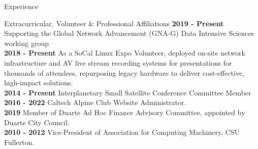 \documentclass{resume} %
\begin{document}
\begin{rSection}{Experience}



\begin{rSection}{ Extracurricular, Volunteer \& Professional Affiliations}
{\bf 2019 - Present} Supporting the Global Network Advancement (GNA-G) Data Intensive Sciences working group \\
{\bf 2018 - Present} As a SoCal Linux Expo Volunteer, deployed on-site network infrastructure and AV live stream recording systems for presentations for thousands of attendees, repurposing legacy hardware to deliver cost-effective, high-impact solutions.\\
{\bf 2014 - Present} Interplanetary Small Satellite Conference Committee Member\\
{\bf 2016 - 2022} Caltech Alpine Club Website Administrator. \\
{\bf 2019} Member of Duarte Ad Hoc Finance Advisory Committee, appointed by Duarte City Council. \\
{\bf 2010 - 2012} Vice-President of Association for Computing Machinery, CSU Fullerton. 
\end{rSection}





\end{rSection}
\end{document}
